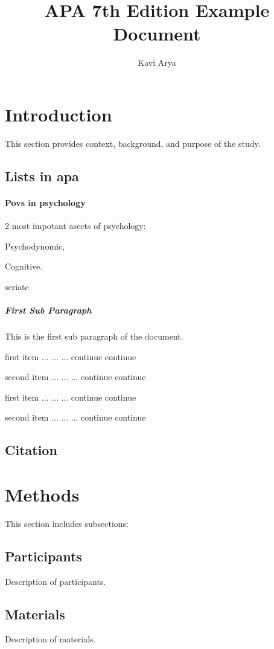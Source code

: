 \documentclass[a4paper,draftfirst,jou,12pt]{apa7}
\title{APA 7th Edition Example Document}
\author{Kavi Arya}
\begin{document}
\maketitle

\section{Introduction}
This section provides context, background, and purpose of the study.
\subsection{Lists in apa}
\paragraph{Povs in psychology} 2 most impotant asects of psychology: \begin{seriate} \item Psychodynomic, \item Cognitive. \end{seriate}
seriate

\subparagraph{First Sub Paragraph}This is the first sub paragraph of the document.
\begin{APAenumerate}
  \item first item ... ... ... continue continue
  \item second item ... ... ... continue continue
\end{APAenumerate}
\begin{APAitemize}
\item first item ... ... ... continue continue
\item second item ... ... ... continue continue
\end{APAitemize}

\subsection{Citation}

\lipsum[1]

\section{Methods}
This section includes subsections:
\lipsum[2]
\subsection{Participants}
\lipsum[3]
Description of participants.
\subsection{Materials}
\lipsum[4]
Description of materials.
\end{document}
